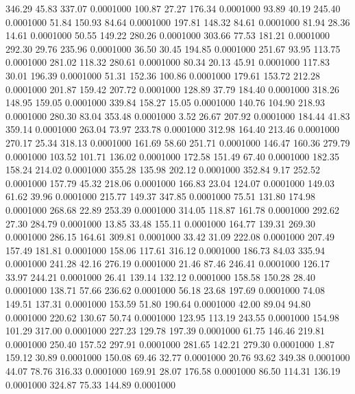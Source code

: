  346.29   45.83  337.07   0.0001000
 100.87   27.27  176.34   0.0001000
  93.89   40.19  245.40   0.0001000
  51.84  150.93   84.64   0.0001000
 197.81  148.32   84.61   0.0001000
  81.94   28.36   14.61   0.0001000
  50.55  149.22  280.26   0.0001000
 303.66   77.53  181.21   0.0001000
 292.30   29.76  235.96   0.0001000
  36.50   30.45  194.85   0.0001000
 251.67   93.95  113.75   0.0001000
 281.02  118.32  280.61   0.0001000
  80.34   20.13   45.91   0.0001000
 117.83   30.01  196.39   0.0001000
  51.31  152.36  100.86   0.0001000
 179.61  153.72  212.28   0.0001000
 201.87  159.42  207.72   0.0001000
 128.89   37.79  184.40   0.0001000
 318.26  148.95  159.05   0.0001000
 339.84  158.27   15.05   0.0001000
 140.76  104.90  218.93   0.0001000
 280.30   83.04  353.48   0.0001000
   3.52   26.67  207.92   0.0001000
 184.44   41.83  359.14   0.0001000
 263.04   73.97  233.78   0.0001000
 312.98  164.40  213.46   0.0001000
 270.17   25.34  318.13   0.0001000
 161.69   58.60  251.71   0.0001000
 146.47  160.36  279.79   0.0001000
 103.52  101.71  136.02   0.0001000
 172.58  151.49   67.40   0.0001000
 182.35  158.24  214.02   0.0001000
 355.28  135.98  202.12   0.0001000
 352.84    9.17  252.52   0.0001000
 157.79   45.32  218.06   0.0001000
 166.83   23.04  124.07   0.0001000
 149.03   61.62   39.96   0.0001000
 215.77  149.37  347.85   0.0001000
  75.51  131.80  174.98   0.0001000
 268.68   22.89  253.39   0.0001000
 314.05  118.87  161.78   0.0001000
 292.62   27.30  284.79   0.0001000
  13.85   33.48  155.11   0.0001000
 164.77  139.31  269.30   0.0001000
 286.15  164.61  309.81   0.0001000
  33.42   31.09  222.08   0.0001000
 207.49  157.49  181.81   0.0001000
 158.06  117.61  316.12   0.0001000
 186.73   84.03  335.94   0.0001000
 241.28   42.16  276.19   0.0001000
  21.46   87.46  246.41   0.0001000
 126.17   33.97  244.21   0.0001000
  26.41  139.14  132.12   0.0001000
 158.58  150.28   28.40   0.0001000
 138.71   57.66  236.62   0.0001000
  56.18   23.68  197.69   0.0001000
  74.08  149.51  137.31   0.0001000
 153.59   51.80  190.64   0.0001000
  42.00   89.04   94.80   0.0001000
 220.62  130.67   50.74   0.0001000
 123.95  113.19  243.55   0.0001000
 154.98  101.29  317.00   0.0001000
 227.23  129.78  197.39   0.0001000
  61.75  146.46  219.81   0.0001000
 250.40  157.52  297.91   0.0001000
 281.65  142.21  279.30   0.0001000
   1.87  159.12   30.89   0.0001000
 150.08   69.46   32.77   0.0001000
  20.76   93.62  349.38   0.0001000
  44.07   78.76  316.33   0.0001000
 169.91   28.07  176.58   0.0001000
  86.50  114.31  136.19   0.0001000
 324.87   75.33  144.89   0.0001000
